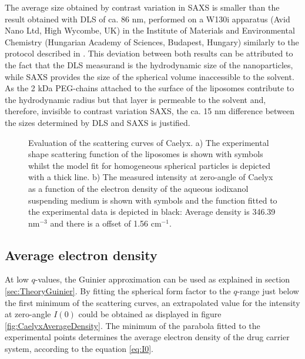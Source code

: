 The average size obtained by contrast variation in SAXS is smaller than the result obtained with DLS of ca. 86 nm, performed on a W130i apparatus (Avid Nano Ltd, High Wycombe, UK) in the Institute of Materials and Environmental Chemistry (Hungarian Academy of Sciences, Budapest, Hungary) similarly to the protocol described in \cite{varga_osmotic_2014}. This deviation between both results can be attributed to the fact that the DLS measurand is the hydrodynamic size of the nanoparticles, while SAXS provides the size of the spherical volume inaccessible to the solvent. As the 2 kDa PEG-chains attached to the surface of the liposomes contribute to the hydrodynamic radius but that layer is permeable to the solvent and, therefore, invisible to contrast variation SAXS, the ca. 15 nm difference between the sizes determined by DLS and SAXS is justified. 

\begin{figure}
	\centering
		\qquad
		\caption[Shape scattering function and zero-angle intensity of Caelyx.]{Evaluation of the scattering curves of Caelyx. a) The experimental shape scattering function of the liposomes is shown with symbols whilst the model fit for homogeneous spherical particles is depicted with a thick line.  b) The measured intensity at zero-angle of Caelyx as a function of the electron density of the aqueous iodixanol suspending medium is shown with symbols and the function fitted to the experimental data is depicted in black: Average density is 346.39 nm$^{-3}$ and there is a offset of 1.56 cm$^{-1}$.}
\end{figure}

\subsection{Average electron density}
At low $q$-values, the Guinier approximation can be used as explained in section \ref{sec:TheoryGuinier}. By fitting the spherical form factor to the $q$-range just below the first minimum of the scattering curves, an extrapolated value for the intensity at zero-angle $I(0)$ could be obtained as displayed in figure \ref{fig:CaelyxAverageDensity}. The minimum of the parabola fitted to the experimental points determines the average electron density of the drug carrier system, according to the equation \ref{eq:I0}.

